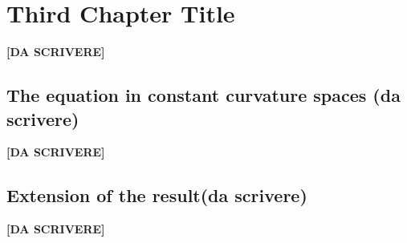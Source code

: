 \chapter{Third Chapter Title}
{\vspace{10pt}\LARGE \bf [DA SCRIVERE]}

\section{The equation in constant curvature spaces (da scrivere)}	
{\vspace{10pt}\LARGE \bf [DA SCRIVERE]}

\clearpage
\section{Extension of the result(da scrivere)}	
{\vspace{10pt}\LARGE \bf [DA SCRIVERE]}
